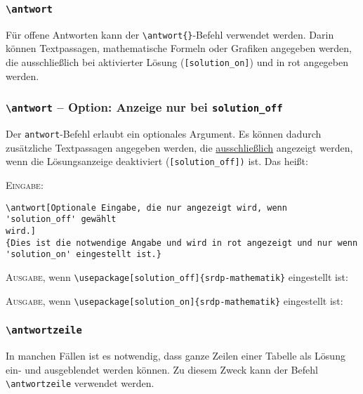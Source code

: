 \documentclass[a4paper,12pt]{article}
\begin{document}
\subsubsection{\texttt{\textbackslash antwort}}
Für offene Antworten kann der \texttt{\textbackslash antwort\{\}}-Befehl verwendet werden. Darin können Textpassagen, mathematische Formeln oder Grafiken angegeben werden, die ausschließlich bei aktivierter Lösung (\texttt{[solution\_on]}) und in \textcolor[rgb]{1,0,0}{rot} angegeben werden. \leer


\subsubsection*{\texttt{\textbackslash antwort} -- Option: Anzeige nur bei \texttt{solution\_off}}

Der \texttt{antwort}-Befehl erlaubt ein optionales Argument. Es können dadurch zusätzliche Textpassagen angegeben werden, die \underline{ausschließlich} angezeigt werden, wenn die Lösungsanzeige deaktiviert (\texttt{[solution\_off])} ist. Das heißt: \leer

\textsc{Eingabe:}
\begin{verbatim}
\antwort[Optionale Eingabe, die nur angezeigt wird, wenn 'solution_off' gewählt 
wird.]
{Dies ist die notwendige Angabe und wird in rot angezeigt und nur wenn 
'solution_on' eingestellt ist.}  
\end{verbatim}


\textsc{Ausgabe}, wenn \texttt{\textbackslash usepackage[solution\_off]\{srdp-mathematik\}} eingestellt ist: \\

\setcounter{Antworten}{0}
\leer

\textsc{Ausgabe}, wenn \texttt{\textbackslash usepackage[solution\_on]\{srdp-mathematik\}} eingestellt ist:\\

\setcounter{Antworten}{1}

\subsubsection{\texttt{\textbackslash antwortzeile}}
In manchen Fällen ist es notwendig, dass ganze Zeilen einer Tabelle als Lösung ein- und ausgeblendet werden können. Zu diesem Zweck kann der Befehl \texttt{\textbackslash antwortzeile} verwendet werden.\leer
\end{document}
